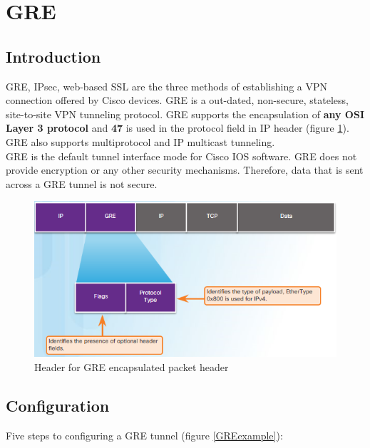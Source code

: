 \section{GRE}

\subsection{Introduction}

GRE, IPsec, web-based SSL are the three methods of establishing a VPN connection offered by Cisco devices. GRE is a out-dated, non-secure, stateless, site-to-site VPN tunneling protocol. GRE supports the encapsulation of \textbf{any OSI Layer 3 protocol} and \textbf{47} is used in the protocol field in IP header (figure \ref{GREpacket}). GRE also supports multiprotocol and IP multicast tunneling.\\

GRE is the default tunnel interface mode for Cisco IOS software. GRE does not provide encryption or any other security mechanisms. Therefore, data that is sent across a GRE tunnel is not secure.

\begin{figure}[hbtp]
\caption{Header for GRE encapsulated packet header}\label{GREpacket}
\centering
\includegraphics[scale=1]{pictures/GREpacket.PNG}
\end{figure}

\subsection{Configuration}

Five steps to configuring a GRE tunnel (figure \ref{GREexample}):

